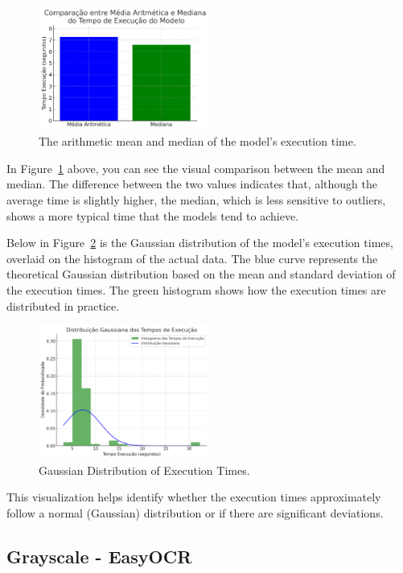 \documentclass[conference]{IEEEtran}
\begin{document}
	\begin{figure}[htbp]
		\centerline{\includegraphics[width=0.5\textwidth]{img5.png}}
		\caption{The arithmetic mean and median of the model's execution time.}
		\label{img5}
	\end{figure}
	
	In Figure~\ref{img5} above, you can see the visual comparison between the mean and median. The difference between the two values indicates that, although the average time is slightly higher, the median, which is less sensitive to outliers, shows a more typical time that the models tend to achieve.
	
	Below in Figure~\ref{img6} is the Gaussian distribution of the model's execution times, overlaid on the histogram of the actual data. The blue curve represents the theoretical Gaussian distribution based on the mean and standard deviation of the execution times. The green histogram shows how the execution times are distributed in practice.
	
	\begin{figure}[htbp]
		\centerline{\includegraphics[width=0.5\textwidth]{img6.png}}
		\caption{Gaussian Distribution of Execution Times.}
		\label{img6}
	\end{figure}
	
	This visualization helps identify whether the execution times approximately follow a normal (Gaussian) distribution or if there are significant deviations.
	
	\subsection{Grayscale - EasyOCR}
	
\end{document}
